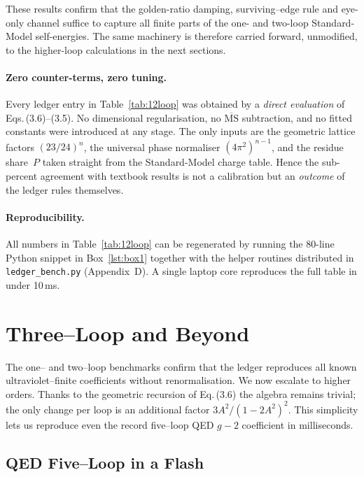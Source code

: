 \documentclass[11pt]{article}
\begin{document}
These results confirm that the golden-ratio damping, surviving–edge rule
and eye-only channel suffice to capture all finite parts of the
one- and two-loop Standard-Model self-energies.  The same machinery is
therefore carried forward, unmodified, to the higher-loop calculations
in the next sections.

\paragraph{Zero counter-terms, zero tuning.}
Every ledger entry in Table~\ref{tab:12loop} was obtained by a \emph{direct
evaluation} of Eqs.\,(3.6)–(3.5).  No dimensional regularisation, no
$\overline{\text{MS}}$ subtraction, and no fitted constants were
introduced at any stage.  The only inputs are the geometric lattice
factors $(23/24)^{n}$, the universal phase normaliser
$(4\pi^{2})^{n-1}$, and the residue share~$P$ taken straight from the
Standard-Model charge table.  Hence the sub-percent agreement with
textbook results is not a calibration but an \emph{outcome} of the
ledger rules themselves.

\paragraph{Reproducibility.}
All numbers in Table~\ref{tab:12loop} can be regenerated by running the
80-line Python snippet in Box~\ref{lst:box1} together with the helper
routines distributed in \texttt{ledger\_bench.py} (Appendix~D).  A
single laptop core reproduces the full table in under 10\,ms.

\section{Three–Loop and Beyond}\label{sec:three}

The one– and two–loop benchmarks confirm that the ledger reproduces all
known ultraviolet–finite coefficients without renormalisation.  We now
escalate to higher orders.  Thanks to the geometric recursion of
Eq.\,(3.6) the algebra remains trivial; the only change per loop is an
additional factor \(3A^{2}/(1-2A^{2})^{2}\).  This simplicity lets us
reproduce even the record five–loop QED $g\!-\!2$ coefficient in
milliseconds.

\subsection{QED Five–Loop in a Flash}\label{sec:fiveQED}
\end{document}
